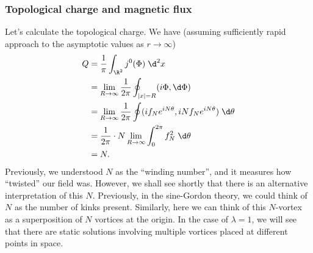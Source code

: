 \documentclass[a4paper]{article}
\begin{document}
\subsubsection*{Topological charge and magnetic flux}
Let's calculate the topological charge. We have (assuming sufficiently rapid approach to the asymptotic values as $r \to \infty$)
\begin{align*}
  Q &= \frac{1}{\pi} \int_{\R^2} j^0(\Phi)\;\d^2 x \\
  &= \lim_{R \to \infty} \frac{1}{2\pi} \oint_{|x| = R} (i \Phi, \d \Phi) \\
  &= \lim_{R \to \infty} \frac{1}{2\pi} \oint (if_N e^{iN\theta}, iN f_N e^{iN\theta})\;\d \theta\\
  &= \frac{1}{2\pi} \cdot N \lim_{R \to \infty} \int_0^{2\pi} f_N^2 \;\d \theta\\
  &= N.
\end{align*}
Previously, we understood $N$ as the ``winding number'', and it measures how ``twisted'' our field was. However, we shall see shortly that there is an alternative interpretation of this $N$. Previously, in the sine-Gordon theory, we could think of $N$ as the number of kinks present. Similarly, here we can think of this $N$-vortex as a superposition of $N$ vortices at the origin. In the case of $\lambda = 1$, we will see that there are static solutions involving multiple vortices placed at different points in space.
\end{document}

